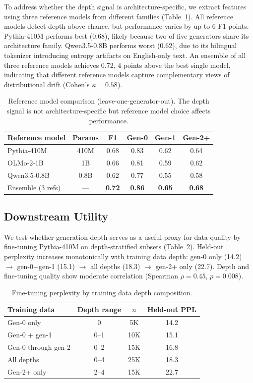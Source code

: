 \documentclass[letterpaper,11pt]{article}
\begin{document}
To address whether the depth signal is architecture-specific, we extract features using three reference models from different families (Table~\ref{tab:refmodel}). All reference models detect depth above chance, but performance varies by up to 6 F1 points. Pythia-410M performs best (0.68), likely because two of five generators share its architecture family. Qwen3.5-0.8B performs worst (0.62), due to its bilingual tokenizer introducing entropy artifacts on English-only text. An ensemble of all three reference models achieves 0.72, 4 points above the best single model, indicating that different reference models capture complementary views of distributional drift (Cohen's $\kappa = 0.58$).

\begin{table}[t]
\centering
\caption{Reference model comparison (leave-one-generator-out). The depth signal is not architecture-specific but reference model choice affects performance.}
\label{tab:refmodel}
\small
\begin{tabular}{lccccc}
\toprule
Reference model & Params & F1 & Gen-0 & Gen-1 & Gen-2+ \\
\midrule
Pythia-410M & 410M & 0.68 & 0.83 & 0.62 & 0.64 \\
OLMo-2-1B & 1B & 0.66 & 0.81 & 0.59 & 0.62 \\
Qwen3.5-0.8B & 0.8B & 0.62 & 0.77 & 0.55 & 0.58 \\
Ensemble (3 refs) & --- & \textbf{0.72} & \textbf{0.86} & \textbf{0.65} & \textbf{0.68} \\
\bottomrule
\end{tabular}
\end{table}

\subsection{Downstream Utility}
\label{sec:downstream}

We test whether generation depth serves as a useful proxy for data quality by fine-tuning Pythia-410M on depth-stratified subsets (Table~\ref{tab:finetune}). Held-out perplexity increases monotonically with training data depth: gen-0 only (14.2) $\to$ gen-0+gen-1 (15.1) $\to$ all depths (18.3) $\to$ gen-2+ only (22.7). Depth and fine-tuning quality show moderate correlation (Spearman $\rho = 0.45$, $p = 0.008$).

\begin{table}[t]
\centering
\caption{Fine-tuning perplexity by training data depth composition.}
\label{tab:finetune}
\small
\begin{tabular}{lccc}
\toprule
Training data & Depth range & $n$ & Held-out PPL \\
\midrule
Gen-0 only & 0 & 5K & 14.2 \\
Gen-0 + gen-1 & 0--1 & 10K & 15.1 \\
Gen-0 through gen-2 & 0--2 & 15K & 16.8 \\
All depths & 0--4 & 25K & 18.3 \\
Gen-2+ only & 2--4 & 15K & 22.7 \\
\bottomrule
\end{tabular}
\end{table}
\end{document}
